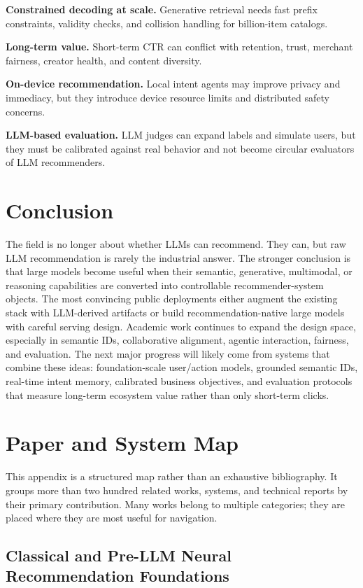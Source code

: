 \documentclass[11pt]{article}
\begin{document}
\textbf{Constrained decoding at scale.} Generative retrieval needs fast prefix constraints, validity checks, and collision handling for billion-item catalogs.

\textbf{Long-term value.} Short-term CTR can conflict with retention, trust, merchant fairness, creator health, and content diversity.

\textbf{On-device recommendation.} Local intent agents may improve privacy and immediacy, but they introduce device resource limits and distributed safety concerns.

\textbf{LLM-based evaluation.} LLM judges can expand labels and simulate users, but they must be calibrated against real behavior and not become circular evaluators of LLM recommenders.

\section{Conclusion}

The field is no longer about whether LLMs can recommend. They can, but raw LLM recommendation is rarely the industrial answer. The stronger conclusion is that large models become useful when their semantic, generative, multimodal, or reasoning capabilities are converted into controllable recommender-system objects. The most convincing public deployments either augment the existing stack with LLM-derived artifacts or build recommendation-native large models with careful serving design. Academic work continues to expand the design space, especially in semantic IDs, collaborative alignment, agentic interaction, fairness, and evaluation. The next major progress will likely come from systems that combine these ideas: foundation-scale user/action models, grounded semantic IDs, real-time intent memory, calibrated business objectives, and evaluation protocols that measure long-term ecosystem value rather than only short-term clicks.

\appendix
\section{Paper and System Map}

This appendix is a structured map rather than an exhaustive bibliography. It groups more than two hundred related works, systems, and technical reports by their primary contribution. Many works belong to multiple categories; they are placed where they are most useful for navigation.

\subsection{Classical and Pre-LLM Neural Recommendation Foundations}
\end{document}

